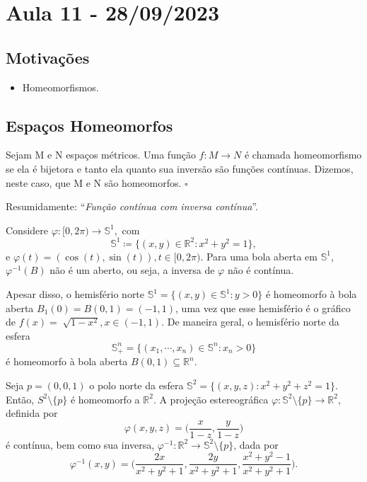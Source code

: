 \documentclass[MetricSpaces/metric_notes.tex]{subfiles}
\begin{document}
\section{Aula 11 - 28/09/2023}
\subsection{Motivações}
\begin{itemize}
	\item Homeomorfismos.
\end{itemize}
\subsection{Espaços Homeomorfos}
\begin{def*}
	Sejam M e N espaços métricos. Uma função \(f:M\rightarrow N\) é chamada homeomorfismo se
	ela é bijetora e tanto ela quanto sua inversão são funções contínuas. Dizemos, neste caso, que M e N
	são homeomorfos. \(\square\)
\end{def*}
Resumidamente: ``\textit{Função contínua com inversa contínua}''.
\begin{example}
	Considere \(\varphi :[0, 2\pi )\rightarrow \mathbb{S}^{1},\) com
	\[
		\mathbb{S}^{1}\coloneqq \{(x, y)\in \mathbb{R}^{2}: x^{2}+y^{2}=1\},
	\]
	e \(\varphi (t) = (\cos{(t)}, \sin{(t)}), t\in[0, 2\pi ).\) Para uma bola aberta em
	\(\mathbb{S}^{1}\), \(\varphi ^{-1}(B)\) não é um aberto, ou seja, a inversa
	de \(\varphi \) não é contínua.

	Apesar disso, o hemisfério norte \(\mathbb{S}^{1}=\{(x, y)\in \mathbb{S}^{1}: y > 0\}\) é
	homeomorfo à bola aberta \(B_{1}(0) = B(0, 1) = (-1, 1)\), uma vez que esse hemisfério é o gráfico
	de \(f(x) = \sqrt[]{1-x^{2}}, x\in (-1, 1).\) De maneira geral, o hemisfério norte
	da esfera
	\[
		\mathbb{S}_{+}^{n} = \{(x_{1}, \cdots, x_{n})\in \mathbb{S}^{n}: x_{n}>0\}
	\]
	é homeomorfo à bola aberta \(B(0, 1)\subseteq{\mathbb{R}^{n}}\).
\end{example}
\begin{example}
	Seja \(p=(0, 0, 1)\) o polo norte da esfera \(\mathbb{S}^{2}=\{(x, y, z): x^{2}+y^{2}+z^{2}=1\}\). Então,
	\(S^{2}\setminus\{p\}\) é homeomorfo a \(\mathbb{R}^{2}.\) A projeção estereográfica
	\(\varphi :\mathbb{S}^{2}\setminus\{p\}\rightarrow \mathbb{R}^{2}\), definida por
	\[
		\varphi (x, y, z) = \biggl(\frac{x}{1-z}, \frac{y}{1-z}\biggr)
	\]
	é contínua, bem como sua inversa, \(\varphi ^{-1}:\mathbb{R}^{2}\rightarrow \mathbb{S}^{2}\setminus\{p\}\), dada por
	\[
		\varphi ^{-1}(x, y) = \biggl(\frac{2x}{x^{2}+y^{2}+1}, \frac{2y}{x^{2}+y^{2}+1}, \frac{x^{2}+y^{2}-1}{x^{2}+y^{2}+1}\biggr).
	\]
\end{example}
\end{document}
